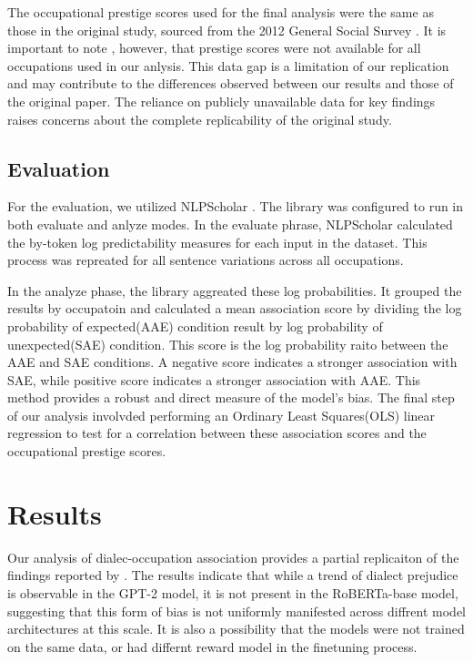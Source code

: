 \documentclass[11pt]{article}
\begin{document}
The occupational prestige scores used for the final analysis were the same as those in the original study, sourced from the 2012 General Social Survey \citep{smith_measuring_2014}. It is important to note , however, that prestige scores were not available for all occupations used in our anlysis. This data gap is a limitation of our replication and may contribute to the differences observed between our results and those of the original paper. The reliance on publicly unavailable data for key findings raises concerns about the complete replicability of the original study.

\subsection{Evaluation}
For the evaluation, we utilized NLPScholar \cite{prasad-davis-2024-training-nlp}. The library was configured to run in both evaluate and anlyze modes. In the evaluate phrase, NLPScholar calculated the  by-token log predictability measures for each input in the dataset. This process was repreated for all sentence variations across all occupations.

In the analyze phase, the library aggreated these log probabilities. It grouped the results by occupatoin and calculated a mean association score by dividing the log probability of expected(AAE) condition result by log probability of unexpected(SAE) condition. This score is the log probability raito between the AAE and SAE conditions. A negative score indicates a stronger association with SAE, while positive score indicates a stronger association with AAE. This method provides a robust and direct measure of the model's bias. The final step of our analysis involvded performing an Ordinary Least Squares(OLS) linear regression to test for a correlation between these association scores and the occupational prestige scores.

\section{Results}

Our analysis of dialec-occupation association provides a partial replicaiton of the findings reported by \citet{hofmann_dialect_2024}. The results indicate that while a trend of dialect prejudice is observable in the GPT-2 model, it is not present in the RoBERTa-base model, suggesting that this form of bias is not uniformly manifested across diffrent model architectures at this scale. It is also a possibility that the models were not trained on the same data, or had differnt reward model in the finetuning process.
\end{document}
